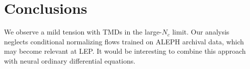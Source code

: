 \section{Conclusions}\label{sec:conclusions}

We observe a mild tension with TMDs in the large-$N_c$ limit. Our
analysis neglects conditional normalizing flows trained on ALEPH
archival data, which may become relevant at LEP. It would be interesting
to combine this approach with neural ordinary differential equations.

